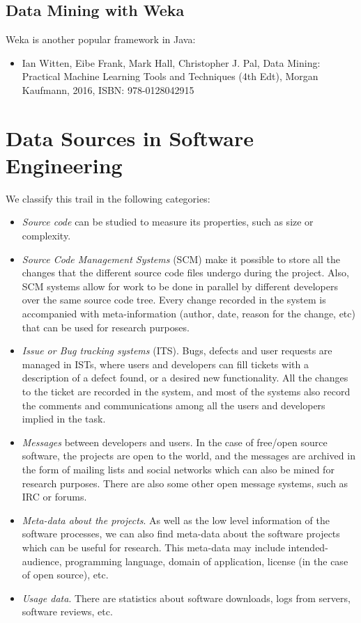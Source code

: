 \documentclass[]{book}
\providecommand{\tightlist}{%
  \setlength{\itemsep}{0pt}\setlength{\parskip}{0pt}}
\begin{document}
\section{Data Mining with Weka}\label{data-mining-with-weka}

Weka is another popular framework in Java:

\begin{itemize}
\tightlist
\item
  Ian Witten, Eibe Frank, Mark Hall, Christopher J. Pal, Data Mining:
  Practical Machine Learning Tools and Techniques (4th Edt), Morgan
  Kaufmann, 2016, ISBN: 978-0128042915
\end{itemize}

\chapter{Data Sources in Software
Engineering}\label{data-sources-in-software-engineering}

We classify this trail in the following categories:

\begin{itemize}
\item
  \emph{Source code} can be studied to measure its properties, such as
  size or complexity.
\item
  \emph{Source Code Management Systems} (SCM) make it possible to store
  all the changes that the different source code files undergo during
  the project. Also, SCM systems allow for work to be done in parallel
  by different developers over the same source code tree. Every change
  recorded in the system is accompanied with meta-information (author,
  date, reason for the change, etc) that can be used for research
  purposes.
\item
  \emph{Issue or Bug tracking systems} (ITS). Bugs, defects and user
  requests are managed in ISTs, where users and developers can fill
  tickets with a description of a defect found, or a desired new
  functionality. All the changes to the ticket are recorded in the
  system, and most of the systems also record the comments and
  communications among all the users and developers implied in the task.
\item
  \emph{Messages} between developers and users. In the case of free/open
  source software, the projects are open to the world, and the messages
  are archived in the form of mailing lists and social networks which
  can also be mined for research purposes. There are also some other
  open message systems, such as IRC or forums.
\item
  \emph{Meta-data about the projects}. As well as the low level
  information of the software processes, we can also find meta-data
  about the software projects which can be useful for research. This
  meta-data may include intended-audience, programming language, domain
  of application, license (in the case of open source), etc.
\item
  \emph{Usage data}. There are statistics about software downloads, logs
  from servers, software reviews, etc.
\end{itemize}
\end{document}
